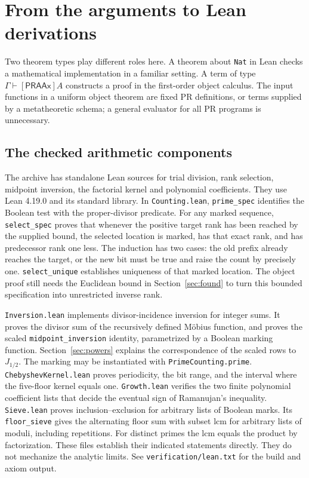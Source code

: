 \section{From the arguments to Lean derivations}
\label{sec:lean}
Two theorem types play different roles here. A theorem about \texttt{Nat} in Lean checks a mathematical implementation in a familiar setting. A term of type $\Gamma\vdash[\mathsf{PRAAx}]A$ constructs a proof in the first-order object calculus. The input functions in a uniform object theorem are fixed PR definitions, or terms supplied by a metatheoretic schema; a general evaluator for all PR programs is unnecessary.

\subsection{The checked arithmetic components}
The archive has standalone Lean sources for trial division, rank selection, midpoint inversion, the factorial kernel and polynomial coefficients. They use Lean 4.19.0 and its standard library. In \texttt{Counting.lean}, \texttt{prime\_spec} identifies the Boolean test with the proper-divisor predicate. For any marked sequence, \texttt{select\_spec} proves that whenever the positive target rank has been reached by the supplied bound, the selected location is marked, has that exact rank, and has predecessor rank one less. The induction has two cases: the old prefix already reaches the target, or the new bit must be true and raise the count by precisely one. \texttt{select\_unique} establishes uniqueness of that marked location. The object proof still needs the Euclidean bound in Section~\ref{sec:found} to turn this bounded specification into unrestricted inverse rank.

\texttt{Inversion.lean} implements divisor-incidence inversion for integer sums. It proves the divisor sum of the recursively defined Möbius function, and proves the scaled \texttt{midpoint\_inversion} identity, parametrized by a Boolean marking function. Section~\ref{sec:powers} explains the correspondence of the scaled rows to $J_{1/2}$. The marking may be instantiated with \texttt{PrimeCounting.prime}. \texttt{ChebyshevKernel.lean} proves periodicity, the bit range, and the interval where the five-floor kernel equals one. \texttt{Growth.lean} verifies the two finite polynomial coefficient lists that decide the eventual sign of Ramanujan's inequality. \texttt{Sieve.lean} proves inclusion--exclusion for arbitrary lists of Boolean marks. Its \texttt{floor\_sieve} gives the alternating floor sum with subset lcm for arbitrary lists of moduli, including repetitions. For distinct primes the lcm equals the product by factorization. These files establish their indicated statements directly. They do not mechanize the analytic limits. See \texttt{verification/lean.txt} for the build and axiom output.

